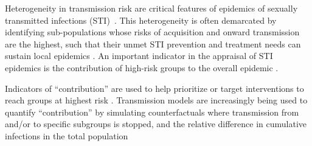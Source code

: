 Heterogeneity in transmission risk are critical features of 
epidemics of sexually transmitted infections (STI)~\cite{Anderson1991}.
This heterogeneity is often demarcated by identifying
sub-populations whose risks of acquisition and onward transmission are the highest,
such that their unmet STI prevention and treatment needs
can sustain local epidemics \citep{Yorke1978}.
An important indicator in the appraisal of STI epidemics is
the contribution of high-risk groups to the overall epidemic \citep{Case2012}.
\par
Indicators of ``contribution'' are used to help prioritize or target interventions
to reach groups at highest risk \citep{Case2012,Shubber2014}.
Transmission models are increasingly being used to quantify
``contribution'' by simulating counterfactuals where transmission 
from and/or to specific subgroups is stopped, and 
the relative difference in cumulative infections in the total population
